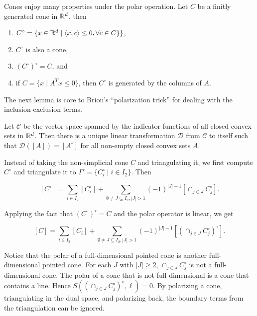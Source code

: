 \begin{lemma}
Cones enjoy many properties under the polar operation. Let $C$ be a finitly generated cone in ${\mathbb R}^d$, then

\begin{enumerate}
\item $C^\circ = \{ x \in {\mathbb R}^d \mid {\langle} x, c {\rangle} \leq 0, \forall c \in C \} \}$, 
\item $C^\circ$ is also a cone,
\item $(C^\circ)^\circ = C$, and
\item if $C = \{ x \mid A^Tx \leq 0 \}$, then $C^\circ$ is generated by the columns of $A$.
\end{enumerate}
\end{lemma}

The next lemma is core to  Brion's ``polarization trick'' \cite{Brion88} for dealing with the inclusion-exclusion terms.

\begin{lemma}
Let $\mathcal{C}$ be the vector space spanned by the indicator functions of all closed convex sets in ${\mathbb R}^d$. Then there is a unique linear transformation  $\mathcal{D}$ from $\mathcal{C}$ to itself such that $\mathcal{D}([A]) = [A^\circ]$ for all non-empty closed convex sets $A$.
\end{lemma}

Instead of taking the non-simplicial cone $C$ and triangulating it, we first compute $C^\circ$ and triangulate it to $\Gamma' = \{C_i^\circ \mid i \in I_2 \}$. Then

 \[ [C^\circ] = \sum_{i \in I_2} [C_i^\circ] + \sum_{\emptyset \neq J \subseteq I_2, |J| > 1} (-1)^{|J|-1} [\cap_{j \in J} C_j^\circ].\]
 
 Applying the fact that $(C^\circ)^\circ = C$ and the polar operator is linear, we get
 
  \[ [C] = \sum_{i \in I_2} [C_i] + \sum_{\emptyset \neq J \subseteq I_2, |J| > 1} (-1)^{|J|-1} [(\cap_{j \in J} C_j^\circ)^\circ].\]
  

Notice that the polar of a full-dimensional pointed cone is another full-dimensional pointed cone. For each $J$ with $|J| \geq 2$, $\cap_{j \in J} C_j^\circ$ is not a full-dimensional cone. The polar of a cone that is not full dimensional is a cone that contains a line. Hence $S((\cap_{j \in J} C_j^\circ)^\circ, \ell) = 0$. By polarizing a cone, triangulating in the dual space, and polarizing back, the boundary terms from the triangulation can be ignored. 

